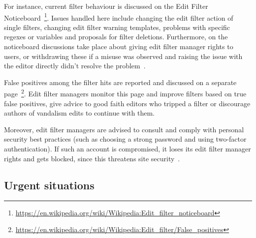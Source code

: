 \documentclass{sigchi}
\begin{document}
For instance, current filter behaviour is discussed on the Edit Filter Noticeboard~\footnote{\url{https://en.wikipedia.org/wiki/Wikipedia:Edit_filter_noticeboard}}.
Issues handled here include changing the edit filter action of single filters, changing edit filter warning templates, problems with specific regexes or variables and proposals for filter deletions.
Furthermore, on the noticeboard discussions take place about giving edit filter manager rights to users, or withdrawing these if a misuse was observed and raising the issue with the editor directly didn't resolve the problem~\cite{Wikipedia:EditFilter}.

False positives among the filter hits are reported and discussed on a separate page~\footnote{\url{https://en.wikipedia.org/wiki/Wikipedia:Edit_filter/False_positives}}.
Edit filter managers monitor this page and improve filters based on true false positives, give advice to good faith editors who tripped a filter or discourage authors of vandalism edits to continue with them.

Moreover, edit filter managers are advised to consult and comply with personal security best practices (such as choosing a strong password and using two-factor authentication).
If such an account is compromised, it loses its edit filter manager rights and gets blocked, since this threatens site security~\cite{Wikipedia:EditFilter}.

\subsection{Urgent situations}
\end{document}
